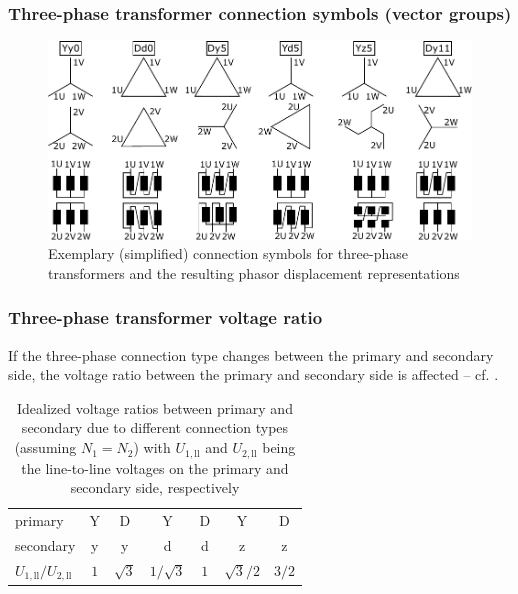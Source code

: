 \begin{frame}
	\frametitle{Three-phase transformer connection symbols (vector groups)}
	\vspace{-0.1cm}
	\begin{figure}
		\includegraphics[height=0.75\textheight]{fig/lec04/Three_phase_transformer_connection_symbols_01.pdf}
		\caption{Exemplary (simplified) connection symbols for three-phase transformers and the resulting phasor displacement representations}
		\label{fig:Three_phase_transformer_connection_symbols_01}
	\end{figure}
\end{frame}

\begin{frame}
	\frametitle{Three-phase transformer voltage ratio}
	If the three-phase connection type changes between the primary and secondary side, the voltage ratio between the primary and secondary side is affected -- cf. .
	\begin{table}
		\centering
		\begin{tabular}{l c c c c c c}
			\toprule
			primary & Y & D & Y & D & Y & D \\
			secondary & y & y & d & d & z & z \\
			\midrule
			$U_{1,\mathrm{ll}}/U_{2,\mathrm{ll}}$ & $1$ & $\sqrt{3}$ & $1/\sqrt{3}$ & $1$ & $\sqrt{3}/2$ & $3/2$ \\ 
			\bottomrule
		\end{tabular}
		\caption{Idealized voltage ratios between primary and secondary due to different connection types (assuming $N_1 = N_2$) with $U_{1,\mathrm{ll}}$ and $U_{2,\mathrm{ll}}$ being the line-to-line voltages on the primary and secondary side, respectively}
		\label{tab:Three_phase_transformer_voltage_ratio}
	\end{table}
\end{frame}

